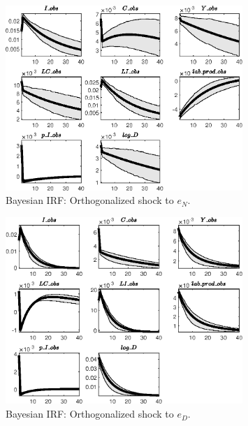 \begin{figure}[H]
\centering 
\includegraphics[width=0.80\textwidth]{BRS_comovement/Output/BRS_comovement_Bayesian_IRF_e_N_1}
\caption{Bayesian IRF: Orthogonalized shock to ${e_N}$.}
\label{Fig:BayesianIRF:e_N:1}
\end{figure}
 
\begin{figure}[H]
\centering 
\includegraphics[width=0.80\textwidth]{BRS_comovement/Output/BRS_comovement_Bayesian_IRF_e_D_1}
\caption{Bayesian IRF: Orthogonalized shock to ${e_D}$.}
\label{Fig:BayesianIRF:e_D:1}
\end{figure}
 
